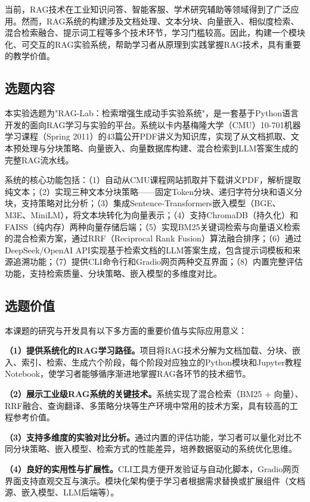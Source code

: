 \documentclass[10pt,a4paper]{article}
\begin{document}
当前，RAG技术在工业知识问答、智能客服、学术研究辅助等领域得到了广泛应用。然而，RAG系统的构建涉及文档处理、文本分块、向量嵌入、相似度检索、混合检索融合、提示词工程等多个技术环节，学习门槛较高。因此，构建一个模块化、可交互的RAG实验系统，帮助学习者从原理到实践掌握RAG技术，具有重要的教学价值。

\subsection{选题内容}

本实验选题为"RAG-Lab：检索增强生成动手实验系统"，是一套基于Python语言开发的面向RAG学习与实验的平台。系统以卡内基梅隆大学（CMU）10-701机器学习课程（Spring 2011）的43篇公开PDF讲义为知识库，实现了从文档抓取、文本预处理与分块策略、向量嵌入、向量数据库构建、混合检索到LLM答案生成的完整RAG流水线。

系统的核心功能包括：（1）自动从CMU课程网站抓取并下载讲义PDF，解析提取纯文本；（2）实现三种文本分块策略——固定Token分块、递归字符分块和语义分块，支持策略对比分析；（3）集成Sentence-Transformers嵌入模型（BGE、M3E、MiniLM），将文本块转化为向量表示；（4）支持ChromaDB（持久化）和FAISS（纯内存）两种向量存储后端；（5）实现BM25关键词检索与向量语义检索的混合检索方案，通过RRF（Reciprocal Rank Fusion）算法融合排序；（6）通过DeepSeek/OpenAI API实现基于检索文档的LLM答案生成，包含提示词模板和来源追溯功能；（7）提供CLI命令行和Gradio网页两种交互界面；（8）内置完整评估功能，支持检索质量、分块策略、嵌入模型的多维度对比。

\subsection{选题价值}

本课题的研究与开发具有以下多方面的重要价值与实际应用意义：

\textbf{（1）提供系统化的RAG学习路径。}项目将RAG技术分解为文档加载、分块、嵌入、索引、检索、生成六个阶段，每个阶段对应独立的Python模块和Jupyter教程Notebook，使学习者能够循序渐进地掌握RAG各环节的技术细节。

\textbf{（2）展示工业级RAG系统的关键技术。}系统实现了混合检索（BM25 + 向量）、RRF融合、查询翻译、多策略分块等生产环境中常用的技术方案，具有较高的工程参考价值。

\textbf{（3）支持多维度的实验对比分析。}通过内置的评估功能，学习者可以量化对比不同分块策略、嵌入模型、检索方式的性能差异，培养数据驱动的系统优化思维。

\textbf{（4）良好的实用性与扩展性。}CLI工具方便开发验证与自动化脚本，Gradio网页界面支持直观交互与演示。模块化架构便于学习者根据需求替换或扩展组件（文档源、嵌入模型、LLM后端等）。
\end{document}
